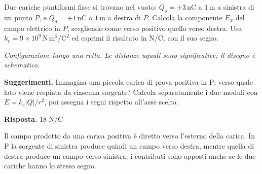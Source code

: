\documentclass[11pt,a4paper]{article}
\begin{document}
\begin{samepage}
\par\smallskip
Due cariche puntiformi fisse si trovano nel vuoto: \(Q_s=+3\,\mathrm{nC}\) a \(1\,\mathrm m\) a sinistra di un punto \(P\), e \(Q_d=+1\,\mathrm{nC}\) a \(1\,\mathrm m\) a destra di \(P\). Calcola la componente \(E_x\) del campo elettrico in \(P\), scegliendo come verso positivo quello verso destra. Usa \(k_e=9\times10^9\,\mathrm{N\,m^2/C^2}\) ed esprimi il risultato in N/C, con il suo segno.\par

\begin{center}
\par
\small\itshape Configurazione lungo una retta. Le distanze uguali sono significative; il disegno è schematico.
\end{center}

{\small\textbf{Suggerimenti.} Immagina una piccola carica di prova positiva in P: verso quale lato viene respinta da ciascuna sorgente? Calcola separatamente i due moduli con \(E=k_e|Q|/r^2\), poi assegna i segni rispetto all’asse scelto.\par}
\medskip\noindent\textbf{Risposta.} 18 N/C\par


Il campo prodotto da una carica positiva è diretto verso l’esterno della carica. In P la sorgente di sinistra produce quindi un campo verso destra, mentre quella di destra produce un campo verso sinistra: i contributi sono opposti anche se le due cariche hanno lo stesso segno.\par


\end{samepage}
\end{document}
